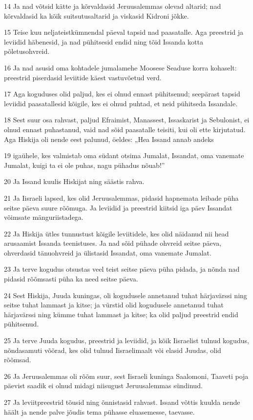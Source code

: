 \par 14 Ja nad võtsid kätte ja kõrvaldasid Jeruusalemmas olevad altarid; nad kõrvaldasid ka kõik suitsutusaltarid ja viskasid Kidroni jõkke.
\par 15 Teise kuu neljateistkümnendal päeval tapsid nad paasatalle. Aga preestrid ja leviidid häbenesid, ja nad pühitsesid endid ning tõid Issanda kotta põletusohvreid.
\par 16 Ja nad asusid oma kohtadele jumalamehe Moosese Seaduse korra kohaselt: preestrid piserdasid leviitide käest vastuvõetud verd.
\par 17 Aga koguduses olid paljud, kes ei olnud ennast pühitsenud; seepärast tapsid leviidid paasatallesid kõigile, kes ei olnud puhtad, et neid pühitseda Issandale.
\par 18 Sest suur osa rahvast, paljud Efraimist, Manassest, Issaskarist ja Sebulonist, ei olnud ennast puhastanud, vaid nad sõid paasatalle teisiti, kui oli ette kirjutatud. Aga Hiskija oli nende eest palunud, öeldes: „Hea Issand annab andeks
\par 19 igaühele, kes valmistab oma südant otsima Jumalat, Issandat, oma vanemate Jumalat, kuigi ta ei ole puhas, nagu pühadus nõuab!”
\par 20 Ja Issand kuulis Hiskijat ning säästis rahva.
\par 21 Ja Iisraeli lapsed, kes olid Jeruusalemmas, pidasid hapnemata leibade püha seitse päeva suure rõõmuga. Ja leviidid ja preestrid kiitsid iga päev Issandat võimsate mänguriistadega.
\par 22 Ja Hiskija ütles tunnustust kõigile leviitidele, kes olid näidanud nii head arusaamist Issanda teenistuses. Ja nad sõid pühade ohvreid seitse päeva, ohverdasid tänuohvreid ja ülistasid Issandat, oma vanemate Jumalat.
\par 23 Ja terve kogudus otsustas veel teist seitse päeva püha pidada, ja nõnda nad pidasid rõõmsasti püha ka need seitse päeva.
\par 24 Sest Hiskija, Juuda kuningas, oli kogudusele annetanud tuhat härjavärssi ning seitse tuhat lammast ja kitse; ja vürstid olid kogudusele annetanud tuhat härjavärssi ning kümme tuhat lammast ja kitse; ka olid paljud preestrid endid pühitsenud.
\par 25 Ja terve Juuda kogudus, preestrid ja leviidid, ja kõik Iisraelist tulnud kogudus, nõndasamuti võõrad, kes olid tulnud Iisraelimaalt või elasid Juudas, olid rõõmsad.
\par 26 Ja Jeruusalemmas oli rõõm suur, sest Iisraeli kuninga Saalomoni, Taaveti poja päevist saadik ei olnud midagi niisugust Jeruusalemmas sündinud.
\par 27 Ja leviitpreestrid tõusid ning õnnistasid rahvast. Issand võttis kuulda nende häält ja nende palve jõudis tema pühasse eluasemesse, taevasse.

